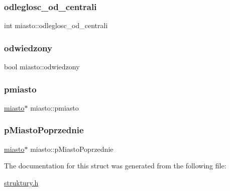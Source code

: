 \subsubsection{\texorpdfstring{odleglosc\+\_\+od\+\_\+centrali}{odleglosc\_od\_centrali}}
{\footnotesize\ttfamily int miasto\+::odleglosc\+\_\+od\+\_\+centrali}

\mbox{\label{structmiasto_a7a2028174edb36e184c06d084d02ef27}} 
\subsubsection{\texorpdfstring{odwiedzony}{odwiedzony}}
{\footnotesize\ttfamily bool miasto\+::odwiedzony}

\mbox{\label{structmiasto_a9cd7b8d4e3e00ba833d3149b76a918f9}} 
\subsubsection{\texorpdfstring{pmiasto}{pmiasto}}
{\footnotesize\ttfamily \mbox{\hyperlink{structmiasto}{miasto}}$\ast$ miasto\+::pmiasto}

\mbox{\label{structmiasto_a8238eaa6785b35e180170ae00996e515}} 
\subsubsection{\texorpdfstring{p\+Miasto\+Poprzednie}{pMiastoPoprzednie}}
{\footnotesize\ttfamily \mbox{\hyperlink{structmiasto}{miasto}}$\ast$ miasto\+::p\+Miasto\+Poprzednie}



The documentation for this struct was generated from the following file\+:\begin{DoxyCompactItemize}
\item 
\mbox{\hyperlink{struktury_8h}{struktury.\+h}}\end{DoxyCompactItemize}
